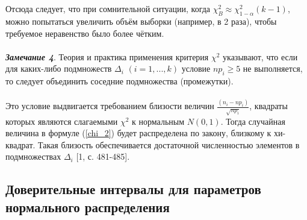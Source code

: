 \documentclass[a4paper,14pt]{article}
\begin{document}
	\\\\
	Отсюда следует, что при сомнительной ситуации, когда $\chi^{2}_{B} \approx \chi^{2}_{1-\alpha}(k-1)$, можно попытаться увеличить объём выборки (например, в 2 раза), чтобы требуемое неравенство было более чётким.
	\\\\
	\textbf{\textit{Замечание 4}}. Теория и практика применения критерия  $\chi^{2}$ указывают, что если для каких-либо подмножеств $\Delta_{i}$ $(i = 1, ... ,k)$ условие $np_{i} \geq 5$ не выполняется, то следует объединить соседние подмножества (промежутки).
	\\\\
	Это условие выдвигается требованием близости величин $\frac{(n_{i} -np_{i})}{\sqrt{np_{i}}}$, квадраты которых являются слагаемыми $\chi^{2}$  к нормальным $N(0,1)$. Тогда случайная величина в формуле (\ref{chi_2}) будет распределена по закону, близкому к хи-квадрат. Такая близость обеспечивается достаточной численностью элементов в подмножествах $\Delta_{i}$ [1, с. 481-485].
	
	\subsection{Доверительные интервалы для параметров нормального распределения}
\end{document}
